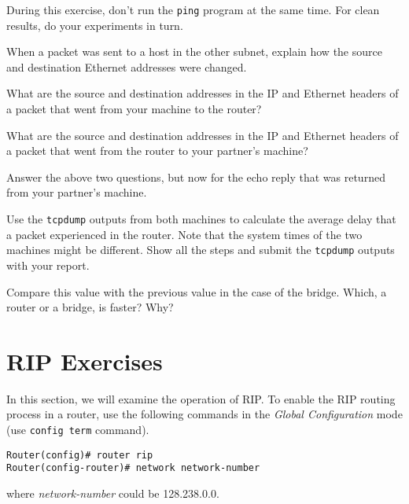 \documentclass{../UTNetLab}
\begin{document}
    During this exercise, don’t run the \lstinline{ping} program at the same time.
    For clean results, do your experiments in turn.
    
    \begin{report}
        \item When a packet was sent to a host in the other subnet, explain how the source and destination Ethernet addresses were changed.
        
        \item What are the source and destination addresses in the IP and Ethernet headers of a packet that went from your machine to the router?
        
        \item What are the source and destination addresses in the IP and Ethernet headers of a packet that went from the router to your partner’s machine?
        
        \item Answer the above two questions, but now for the echo reply that was returned from your partner’s machine.

        \item Use the \lstinline{tcpdump} outputs from both machines to calculate the average delay that a packet experienced in the router.
                Note that the system times of the two machines might be different.
                Show all the steps and submit the \lstinline{tcpdump} outputs with your report.
        
        \item Compare this value with the previous value in the case of the bridge.
                Which, a router or a bridge, is faster? Why?
    \end{report}

\part{RIP Exercises}\label{sec:rip}
    In this section, we will examine the operation of RIP.
    To enable the RIP routing process in a router, use the following commands in the \textit{Global Configuration} mode (use \lstinline[language={cisco}]{config term} command).
    \begin{lstlisting}[language={cisco}, emph={network-number}]
Router(config)# router rip
Router(config-router)# network network-number
    \end{lstlisting}
    where \textit{network-number} could be 128.238.0.0.
    
\end{document}
